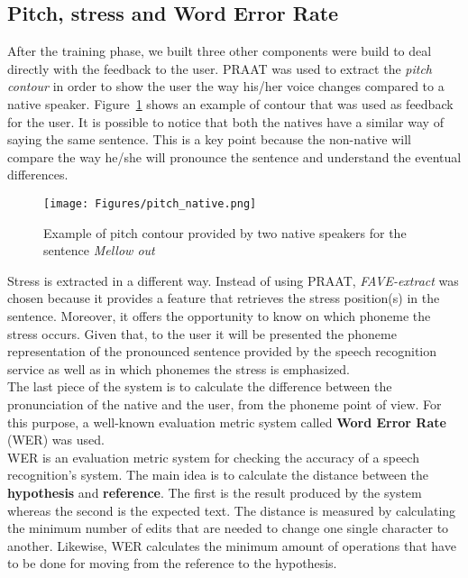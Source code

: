\subsection{Pitch, stress and Word Error Rate}
\noindent After the training phase, we built three other components were build to deal directly with the feedback to the user. PRAAT was used to extract the \textit{pitch contour} in order to show the user the way his/her voice changes compared to a native speaker. Figure~\ref{fig:pitch_native} shows an example of contour that was used as feedback for the user. It is possible to notice that both the natives have a similar way of saying the same sentence. This is a key point because the non-native will compare the way he/she will pronounce the sentence and understand the eventual differences. \\

\begin{figure}[!ht]
	\centering
	\texttt{[image: Figures/pitch\_native.png]}
	\caption{Example of pitch contour provided by two native speakers for the sentence \textit{Mellow out}}
	\label{fig:pitch_native}
\end{figure}

\noindent Stress is extracted in a different way. Instead of using PRAAT, \textit{FAVE-extract} was chosen because it provides a feature that retrieves the stress position(s) in the sentence. Moreover, it offers the opportunity to know on which phoneme the stress occurs. Given that, to the user it will be presented the phoneme representation of the pronounced sentence provided by the speech recognition service as well as in which phonemes the stress is emphasized. \\

\noindent The last piece of the system is to calculate the difference between the pronunciation of the native and the user, from the phoneme point of view. For this purpose, a well-known evaluation metric system called \textbf{Word Error Rate} (WER) was used. \\

\noindent WER is an evaluation metric system for checking the accuracy of a speech recognition's system. The main idea is to calculate the distance between the \textbf{hypothesis} and \textbf{reference}. The first is the result produced by the system whereas the second is the expected text. The distance is measured by calculating the minimum number of edits that are needed to change one single character to another. Likewise, WER calculates the minimum amount of operations that have to be done for moving from the reference to the hypothesis. \\ \\ \\ \\

